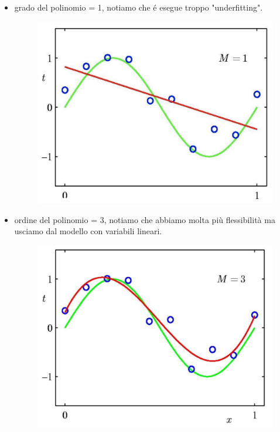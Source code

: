 \documentclass{article}
\begin{document}
\begin{itemize}
    \item grado del polinomio = 1, notiamo che é esegue troppo "underfitting".
    \begin{figure}[H]
    \centering
    \includegraphics[scale=0.3]{Images/polgrado1underfit.png}
    \end{figure}
    
    \item ordine del polinomio = 3, notiamo che abbiamo molta più flessibilità ma usciamo dal modello con variabili lineari.
    \begin{figure}[H]
    \centering
    \includegraphics[scale=0.3]{Images/3gradepol.png}
    \end{figure}
    

\end{itemize}
\end{document}
